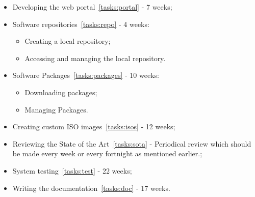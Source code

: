 \begin{itemize}
\item Developing the web portal~\ref{tasks:portal} - 7 weeks;
\item Software repositories~\ref{tasks:repo} - 4 weeks:
	\begin{itemize}
	\item Creating a local repository;
	\item Accessing and managing the local repository.
	\end{itemize}
\item Software Packages~\ref{tasks:packages} - 10 weeks:
	\begin{itemize}
	\item Downloading packages;
	\item Managing Packages.
	\end{itemize}
\item Creating custom ISO images~\ref{tasks:isos} - 12 weeks;
\item Reviewing the State of the Art~\ref{tasks:sota} - Periodical review which should be made every week or every fortnight as mentioned earlier.;
\item System testing~\ref{tasks:test} - 22 weeks;
\item Writing the documentation~\ref{tasks:doc} - 17 weeks.
\end{itemize}
